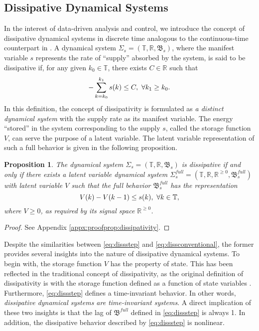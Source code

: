 \documentclass[11pt,print,draftcls,onecolumn,romanappendices]{ieeecolor}
\newtheorem{prop}[thm]{Proposition}
\newcommand{\T}{\mathbb{T}}
\newcommand{\R}{\mathbb{R}}
\newcommand{\revise}[1]{{\color{black} #1}}
\newcommand{\B}{\mathfrak{B}}
\begin{document}
\subsection{Dissipative Dynamical Systems}
In the interest of data-driven analysis and control, we introduce the concept of dissipative dynamical systems in discrete time analogous to the continuous-time counterpart in \cite{Willems:2007a}. A dynamical system $\Sigma_s=(\T,\R,\B_s)$, where the manifest variable $s$ represents the rate of ``supply'' absorbed by the system, is said to be dissipative if, for any given $k_0\in\T$, there exists $C\in\R$ such that
\begin{equation}\label{eq:diss}
	-\sum_{k=k_0}^{k_1}s\revise{(k)}\leq C, \ \forall k_1\geq k_0.
\end{equation}
In this definition, the concept of dissipativity is formulated as \emph{a distinct dynamical system} with the supply rate as its manifest variable. The energy ``stored'' in the system corresponding to the supply $s$, called the storage function $V$, can serve the purpose of a latent variable. The latent variable representation of such a full behavior is given in the following proposition.

\begin{prop}\label{prop:dissipativity}
	The dynamical system $\Sigma_s=(\T,\R,\B_s)$ is dissipative if and only if there exists a latent variable dynamical system $\Sigma^{full}_s=(\T,\R,\R^{\geq0},\B_s^{full})$ with latent variable $V$ such that the full behavior $\B_s^{full}$ has the representation
	\begin{equation}\label{eq:dissstep}
		V\revise{(k)}-V\revise{(k - 1)}\leq s\revise{(k)}, \ \forall k\in\T,
	\end{equation}
	\revise{where $V\geq0$, as required by its signal space $\R^{\geq0}$.}
\end{prop}
\begin{proof}
	See Appendix \ref{appx:proofprop:dissipativity}.
\end{proof}

Despite the similarities between \eqref{eq:dissstep} and \eqref{eq:dissconventional}, the former provides several insights into the nature of dissipative dynamical systems. To begin with, the storage function $V$ has the property of state. This has been reflected in the traditional concept of dissipativity, as the original definition of dissipativity is with the storage function defined as a function of state variables \cite{Willems:1972,Willems:1972a}. Furthermore, \eqref{eq:dissstep} defines a time-invariant behavior. In other words, \emph{dissipative dynamical systems are time-invariant systems}. A direct implication of these two insights is that the lag of $\B^{full}$ defined in \eqref{eq:dissstep} is always 1. \revise{In addition, the dissipative behavior described by \eqref{eq:dissstep} is nonlinear.}
\end{document}
